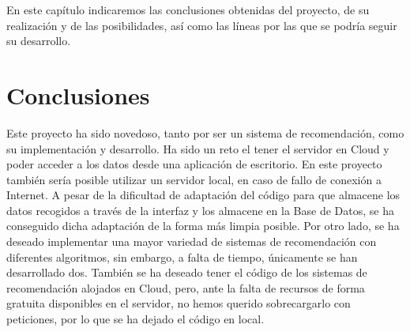 En este capítulo indicaremos las conclusiones obtenidas del proyecto, de su realización y de las posibilidades, así como las líneas por las que se podría seguir su desarrollo. 
\section{Conclusiones}
Este proyecto ha sido novedoso, tanto por ser un  sistema de recomendación, como su implementación  y desarrollo. Ha sido un reto el tener el servidor en Cloud y poder acceder a los datos desde una aplicación de escritorio. En este proyecto también sería posible utilizar un servidor local, en caso de fallo de conexión a Internet. 
A pesar de la dificultad de adaptación del código para que almacene los datos recogidos a través de la interfaz y los almacene en la Base de Datos, se  ha conseguido dicha adaptación de la forma más limpia posible. 
Por otro lado, se ha deseado implementar una mayor variedad de sistemas de recomendación con diferentes algoritmos, sin embargo, a falta de tiempo, únicamente se han desarrollado dos. 
También se ha deseado tener el código de los sistemas de recomendación alojados en Cloud, pero, ante la falta de recursos de forma gratuita disponibles en el servidor, no hemos querido sobrecargarlo con peticiones, por lo que se ha dejado el código en local. 

